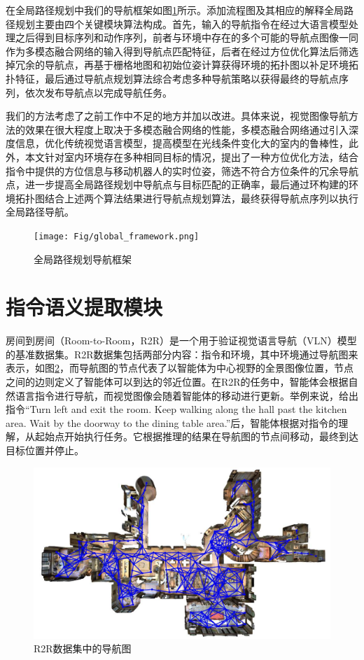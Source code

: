 在全局路径规划中我们的导航框架如图\ref{global_framework}所示。$添加流程图及其相应的解释$全局路径规划主要由四个关键模块算法构成。首先，输入的导航指令在经过大语言模型处理之后得到目标序列和动作序列，前者与环境中存在的多个可能的导航点图像一同作为多模态融合网络的输入得到导航点匹配特征，后者在经过方位优化算法后筛选掉冗余的导航点，再基于栅格地图和初始位姿计算获得环境的拓扑图以补足环境拓扑特征，最后通过导航点规划算法综合考虑多种导航策略以获得最终的导航点序列，依次发布导航点以完成导航任务。

我们的方法考虑了之前工作中不足的地方并加以改进。具体来说，视觉图像导航方法的效果在很大程度上取决于多模态融合网络的性能，多模态融合网络通过引入深度信息，优化传统视觉语言模型，提高模型在光线条件变化大的室内的鲁棒性，此外，本文针对室内环境存在多种相同目标的情况，提出了一种方位优化方法，结合指令中提供的方位信息与移动机器人的实时位姿，筛选不符合方位条件的冗余导航点，进一步提高全局路径规划中导航点与目标匹配的正确率，最后通过环构建的环境拓扑图结合上述两个算法结果进行导航点规划算法，最终获得导航点序列以执行全局路径导航。
\begin{figure}[htbp]
    \centering
    \texttt{[image: Fig/global\_framework.png]}
    \caption{\label{global_framework}全局路径规划导航框架}
\end{figure}


\section{指令语义提取模块}
房间到房间（Room-to-Room，R2R）是一个用于验证视觉语言导航（VLN）模型的基准数据集\cite{anderson2018vision}。R2R数据集包括两部分内容：指令和环境，其中环境通过导航图来表示，如图\ref{r2r_nav}，而导航图的节点代表了以智能体为中心视野的全景图像位置，节点之间的边则定义了智能体可以到达的邻近位置。在R2R的任务中，智能体会根据自然语言指令进行导航，而视觉图像会随着智能体的移动进行更新。举例来说，给出指令“Turn left and exit the room. Keep walking along the hall past the kitchen area. Wait by the doorway to the dining table area.”后，智能体根据对指令的理解，从起始点开始执行任务。它根据推理的结果在导航图的节点间移动，最终到达目标位置并停止。
\begin{figure}[htbp]
    \centering
    \includegraphics[scale=0.55]{Fig/r2r_nav.png}
    \caption{\label{r2r_nav}R2R数据集中的导航图}
\end{figure}

